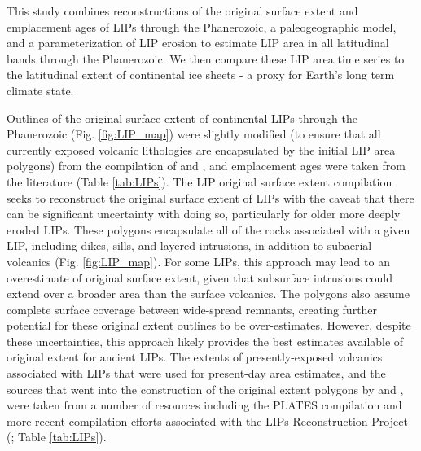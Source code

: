 \documentclass[11pt,letterpaper]{article}
\begin{document}
This study combines reconstructions of the original surface extent and emplacement ages of LIPs through the Phanerozoic, a paleogeographic model, and a parameterization of LIP erosion to estimate LIP area in all latitudinal bands through the Phanerozoic. We then compare these LIP area time series to the latitudinal extent of continental ice sheets - a proxy for Earth's long term climate state.

Outlines of the original surface extent of continental LIPs through the Phanerozoic (Fig. \ref{fig:LIP_map}) were slightly modified (to ensure that all currently exposed volcanic lithologies are encapsulated by the initial LIP area polygons) from the compilation of \citet{Ernst2017a} and \citet{Ernst2019a}, and emplacement ages were taken from the literature (Table \ref{tab:LIPs}). The LIP original surface extent compilation seeks to reconstruct the original surface extent of LIPs with the caveat that there can be significant uncertainty with doing so, particularly for older more deeply eroded LIPs. These polygons encapsulate all of the rocks associated with a given LIP, including dikes, sills, and layered intrusions, in addition to subaerial volcanics (Fig. \ref{fig:LIP_map}). For some LIPs, this approach may lead to an overestimate of original surface extent, given that subsurface intrusions could extend over a broader area than the surface volcanics. The polygons also assume complete surface coverage between wide-spread remnants, creating further potential for these original extent outlines to be over-estimates. However, despite these uncertainties, this approach likely provides the best estimates available of original extent for ancient LIPs. The extents of presently-exposed volcanics associated with LIPs that were used for present-day area estimates, and the sources that went into the construction of the original extent polygons by \citet{Ernst2017a} and \citet{Ernst2019a}, were taken from a number of resources including the PLATES compilation \citep{Coffin2006a} and more recent compilation efforts associated with the LIPs Reconstruction Project (\citealp{Ernst2013a}; Table \ref{tab:LIPs}).
\end{document}
